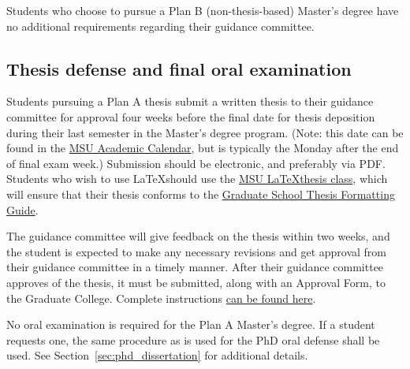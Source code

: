 Students who choose to pursue a Plan B (non-thesis-based) Master's
degree have no additional requirements regarding their guidance
committee.

\subsection{Thesis defense and final oral examination}

Students pursuing a Plan A thesis submit a written thesis to their
guidance committee for approval four weeks before the final date for
thesis deposition during their last semester in the Master's degree
program.  (Note: this date can be found in the
\href{https://reg.msu.edu/ROInfo/Calendar/Academic.aspx}{MSU Academic
Calendar}, but is typically the Monday after the end of final exam
week.)  Submission should be electronic, and preferably via PDF.
Students who wish to use \LaTeX should use the
\href{http://ctan.org/pkg/msu-thesis}{MSU \LaTeX thesis class}, which
will ensure that their thesis conforms to the
\href{https://grad.msu.edu/etd/formatting-guide}{Graduate School
Thesis Formatting Guide}.

The guidance committee will give feedback on the thesis within two
weeks, and the student is expected to make any necessary revisions and
get approval from their guidance committee in a timely manner.  After
their guidance committee approves of the thesis, it must be submitted,
along with an Approval Form, to the Graduate College.  Complete
instructions \href{https://grad.msu.edu/etd}{can be found here}.

No oral examination is required for the Plan A Master's degree.  If a
student requests one, the same procedure as is used for the PhD oral
defense shall be used.  See Section~\ref{sec:phd_dissertation} for
additional details.